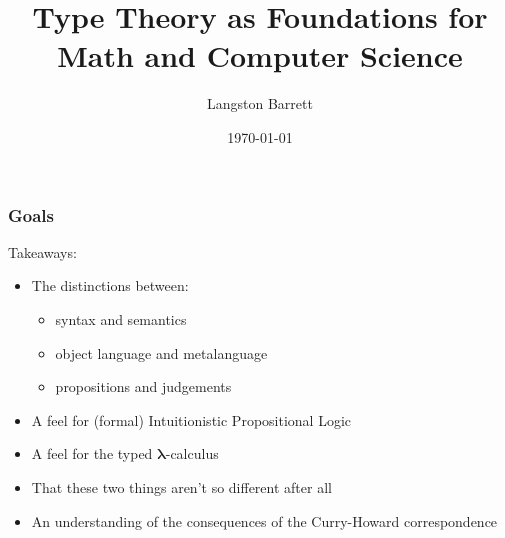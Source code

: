 \documentclass{beamer}
\begin{document}
\title{Type Theory as Foundations for Math and Computer Science}
\author{Langston Barrett}
\date{\today}

\frame{\titlepage}

\begin{frame}
  \frametitle{Goals}

  Takeaways:

  \begin{itemize}
    \itemsep0.4em
    \item The distinctions between:
      \begin{itemize}
        \itemsep0em
        \item syntax and semantics
        \item object language and metalanguage
        \item propositions and judgements
      \end{itemize}
    \item A feel for (formal) Intuitionistic Propositional Logic
    \item A feel for the typed $\mathbf{\lambda}$-calculus
    \item That these two things aren't so different after all
    \item An understanding of the consequences of the Curry-Howard correspondence
  \end{itemize}

\end{frame}
\end{document}
